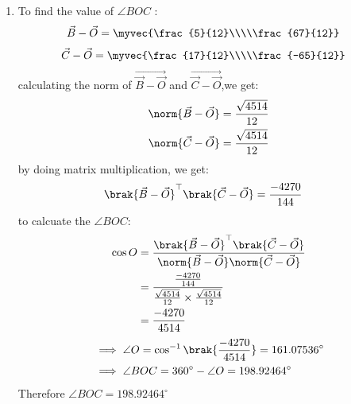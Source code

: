 \documentclass[journal,12pt,twocolumn]{IEEEtran}
\theoremstyle{remark}
\begin{document}
\begin{enumerate}
	\item To find  the value of $\angle{BOC}$ :
\begin{align}
\Vec{B}-\Vec{O}
          &=\myvec{\frac{5}{12}\\\\\frac{67}{12}}
\end{align}
\vspace{0.1cm}
\begin{align}
\Vec{C}-\Vec{O}
          &=\myvec{\frac{17}{12}\\\\\frac{-65}{12}}
\end{align}
\vspace{0.1cm}
calculating the norm of $\Vec{\Vec{B}-\Vec{O}}$ and $\Vec{\Vec{C}-\Vec{O}}$,we get:
\begin{align}
	\norm{\Vec{B}-\Vec{O}}&= \frac{\sqrt{4514}}{12}\\
	\norm{\Vec{C}-\Vec{O}}&= \frac{\sqrt{4514}}{12}
\end{align}
\vspace{0.2cm}
by doing matrix multiplication, we get:
\begin{align}
\brak{\Vec{B}-\Vec{O}}^{\top}\brak{\Vec{C}-\Vec{O}}&=\frac{-4270}{144}
\end{align}
\vspace{0.2cm}
to calcuate the $\angle{BOC}$:
\begin{align}
\cos{O}&=\frac{\brak{\Vec{B}-\Vec{O}}^{\top}\brak{\Vec{C}-\Vec{O}}}{\norm{\Vec{B}-\Vec{O}}\norm{\Vec{C}-\Vec{O}}}\\
&=\frac{\frac{-4270}{144}}{\frac{\sqrt{4514}}{12}\times\frac{\sqrt{4514}}{12}}\\
&=\frac{-4270}{4514}
\end{align}
\vspace{0.1cm}
\begin{align}
&\implies\angle{O}=\cos^{-1}\brak{\frac{-4270}{4514}}=161.07536^{\circ}\\
&\implies\angle{BOC}=360^{\circ}-\angle{O}=198.92464^{\circ}
\end{align}
\vspace{0.4cm}
Therefore $\angle{BOC}=198.92464^{\circ}$
\vspace{0.25cm}







\end{enumerate}
\end{document}
